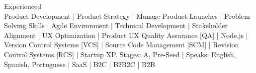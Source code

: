 
Experienced \\
{\scriptsize
Product Development
| Product Strategy
| Manage Product Launches
| Problem-Solving Skills
| Agile Environment
| Technical Development
| Stakeholder Alignment %
| UX Optimization
| Product UX Quality Assurance [QA]
| Node.js
| Version Control Systems [VCS]
| Source Code Management [SCM]
| Revision Control Systems [RCS]
| Startup XP. Stages: A, Pre-Seed
| Speaks: English, Spanish, Portuguese
| SaaS
| B2C
| B2B2C
| B2B
}
\\

